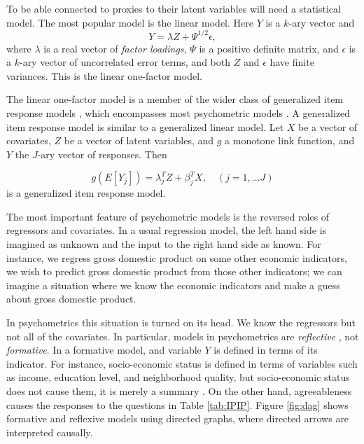 To be able connected to proxies to their latent variables will need a statistical model. The most popular model is the linear model. Here $Y$ is a $k$-ary vector and
\begin{equation}
Y=\lambda Z+\Psi^{1/2}\epsilon,\label{eq:one-factor model}
\end{equation}
where $\lambda$ is a real vector of \emph{factor loadings}, $\Psi$ is a positive definite matrix, and $\epsilon$ is a $k$-ary vector of uncorrelated error terms, and both $Z$ and $\epsilon$ have finite variances. This is the linear one-factor model.

The linear one-factor model is a member of the wider class of generalized item response models \parencite{Mellenbergh1994-iy}, which encompasses most psychometric models \parencite[Chapter 3.1]{Borsboom2005-iq}. A generalized item response model is similar to a generalized linear model. Let $X$ be a vector of covariates, $Z$ be a vector of latent variables, and $g$ a monotone link function, and $Y$ the $J$-ary vector of responses. Then 

\begin{equation}
g(E[Y_{j}])=\lambda_{j}^{T}Z+\beta_{j}^{T}X,\quad(j=1,\ldots J)\label{eq:GLIRT model}
\end{equation}
is a generalized item response model.

The most important feature of psychometric models is the reversed roles of regressors and covariates. In a usual regression model, the left hand side is imagined as unknown and the input to the right hand side as known. For instance, we regress gross domestic product on some other economic indicators, we wish to predict gross domestic product from those other indicators; we can imagine a situation where we know the economic indicators and make a guess about gross domestic product. 

In psychometrics this situation is turned on its head. We know the regressors but not all of the covariates. In particular, models in psychometrics are \emph{reflective} \parencite[p. 61]{Borsboom2005-iq}, not \emph{formative}. In a formative model, and variable $Y$ is defined in terms of its indicator. For instance, socio-economic status is defined in terms of variables such as income, education level, and neighborhood quality, but socio-economic status does not cause them, it is merely a summary \parencite[p. 62]{Borsboom2005-iq}. On the other hand, agreeableness causes the responses to the questions in Table \ref{tab:IPIP}. Figure \ref{fig:dag} shows formative and reflexive models using directed graphs, where directed arrows are interpreted causally.

